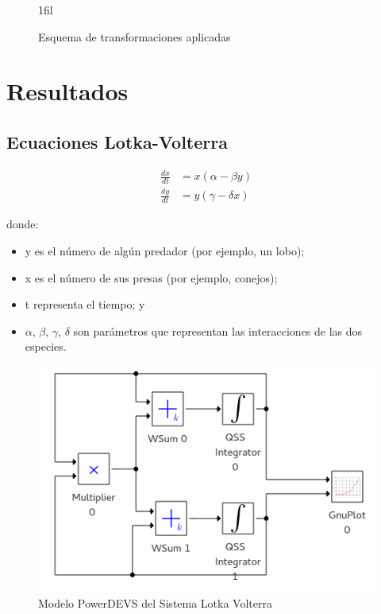 \documentclass{beamer}
\makeatletter
\newcommand*{\centerfloat}{%
  \parindent \z@
  \leftskip \z@ \@plus 1fil \@minus \textwidth
  \rightskip\leftskip
  \parfillskip \z@skip}
\makeatother
\begin{document}
\begin{frame}
\begin{figure}[H]
\centerfloat
{}
\caption{Esquema de transformaciones aplicadas}
\label{fig:pipeline}
\end{figure}
\end{frame}


\chapter{Resultados}
\section{Ecuaciones Lotka-Volterra}
\begin{frame}
\begin{align*}
\frac{dx}{dt} & = x(\alpha - \beta y)\\
\frac{dy}{dt} & =y(\gamma - \delta  x)
\end{align*}

donde:
\begin{itemize}
	\item y es el número de algún predador (por ejemplo, un lobo);
    \item x es el número de sus presas (por ejemplo, conejos);
    \item t representa el tiempo; y
    \item $\alpha$, $\beta$, $\gamma$, $\delta$ son parámetros que representan las interacciones de las dos especies.
\end{itemize}
\end{frame}

\begin{frame}
\begin{figure}[H]
\includegraphics[width=0.75\linewidth]{lotka_voltera_pwd}
\caption{Modelo PowerDEVS del Sistema Lotka Volterra}
\label{model:lotka_volterra}
\end{figure}
\end{frame}
\end{document}

